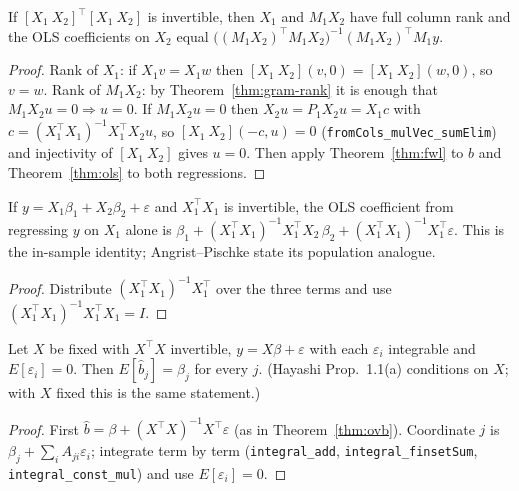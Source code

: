 \begin{corollary}
\label{cor:fwl-formula}
\leanok
{}
If $[X_1\ X_2]^\top[X_1\ X_2]$ is invertible, then $X_1$ and $M_1 X_2$ have full column rank and the
OLS coefficients on $X_2$ equal $\big((M_1X_2)^\top M_1X_2\big)^{-1}(M_1X_2)^\top M_1 y$.
\end{corollary}
\begin{proof}
\leanok
{}
Rank of $X_1$: if $X_1v = X_1w$ then $[X_1\ X_2](v,0) = [X_1\ X_2](w,0)$, so $v = w$. Rank of $M_1X_2$: by Theorem~\ref{thm:gram-rank} it is enough that $M_1 X_2 u = 0 \Rightarrow u = 0$. If $M_1X_2u = 0$ then
$X_2 u = P_1 X_2 u = X_1 c$ with $c = (X_1^\top X_1)^{-1}X_1^\top X_2 u$, so $[X_1\ X_2](-c, u) = 0$
(\texttt{fromCols\_mulVec\_sumElim}) and injectivity of $[X_1\ X_2]$ gives $u = 0$. Then apply
Theorem~\ref{thm:fwl} to $\hat b$ and Theorem~\ref{thm:ols} to both regressions.
\end{proof}

\begin{theorem}
\label{thm:ovb}
\leanok
{}
If $y = X_1\beta_1 + X_2\beta_2 + \varepsilon$ and $X_1^\top X_1$ is invertible, the OLS coefficient from
regressing $y$ on $X_1$ alone is $\beta_1 + (X_1^\top X_1)^{-1}X_1^\top X_2\,\beta_2 + (X_1^\top X_1)^{-1}X_1^\top\varepsilon$.
This is the in-sample identity; Angrist--Pischke state its population analogue.
\end{theorem}
\begin{proof}
\leanok
Distribute $(X_1^\top X_1)^{-1}X_1^\top$ over the three terms and use $(X_1^\top X_1)^{-1}X_1^\top X_1 = I$.
\end{proof}

\begin{theorem}
\label{thm:ols-unbiased}
\leanok
{}
Let $X$ be fixed with $X^\top X$ invertible, $y = X\beta + \varepsilon$ with each $\varepsilon_i$ integrable and
$E[\varepsilon_i] = 0$. Then $E[\hat b_j] = \beta_j$ for every $j$. (Hayashi Prop.~1.1(a) conditions on $X$;
with $X$ fixed this is the same statement.)
\end{theorem}
\begin{proof}
\leanok
First $\hat b = \beta + (X^\top X)^{-1}X^\top\varepsilon$ (as in Theorem~\ref{thm:ovb}). Coordinate $j$ is
$\beta_j + \sum_i A_{ji}\varepsilon_i$; integrate term by term (\texttt{integral\_add},
\texttt{integral\_finsetSum}, \texttt{integral\_const\_mul}) and use $E[\varepsilon_i] = 0$.
\end{proof}


